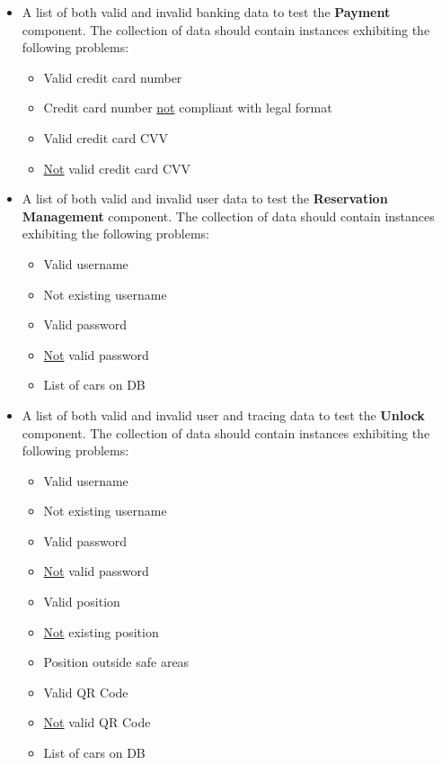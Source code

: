\documentclass[english]{article}
\begin{document}
\begin{itemize}
    \item{A list of both valid and invalid banking data to test the \textbf{Payment} component.
    The collection of data should contain instances exhibiting the following problems:
    \begin{itemize}
      \item{Valid credit card number}
      \item{Credit card number \underline{not} compliant with legal format}
      \item{Valid credit card CVV}
      \item{\underline{Not} valid credit card CVV}
    \end{itemize}}

    \item{A list of both valid and invalid user data to test the \textbf{Reservation Management} component.
    The collection of data should contain instances exhibiting the following problems:
    \begin{itemize}
      \item{Valid username}
      \item{Not existing username}
      \item{Valid password}
      \item{\underline{Not} valid password}
      \item{List of cars on DB}
    \end{itemize}}

    \item{A list of both valid and invalid user and tracing data to test the \textbf{Unlock} component.
    The collection of data should contain instances exhibiting the following problems:
    \begin{itemize}
      \item{Valid username}
      \item{Not existing username}
      \item{Valid password}
      \item{\underline{Not} valid password}
      \item{Valid position}
      \item{\underline{Not} existing position}
      \item{Position outside safe areas}
      \item{Valid QR Code}
      \item{\underline{Not} valid QR Code}
      \item{List of cars on DB}
    \end{itemize}}


\end{itemize}
\end{document}
